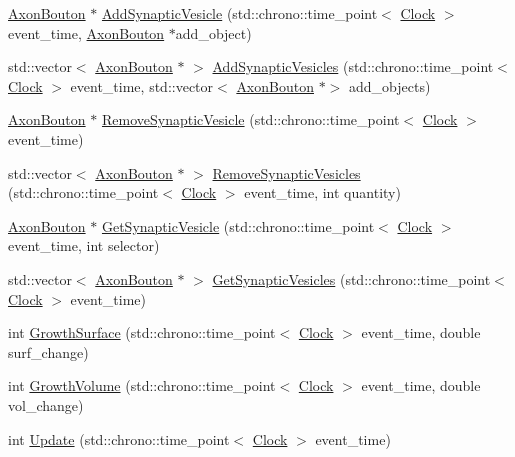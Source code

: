 \begin{DoxyCompactItemize}
\item 
\mbox{\hyperlink{class_axon_bouton}{Axon\+Bouton}} $\ast$ \mbox{\hyperlink{class_axon_bouton_a3009e5d49c699afa7f633b026b37ed77}{Add\+Synaptic\+Vesicle}} (std\+::chrono\+::time\+\_\+point$<$ \mbox{\hyperlink{universe_8h_a0ef8d951d1ca5ab3cfaf7ab4c7a6fd80}{Clock}} $>$ event\+\_\+time, \mbox{\hyperlink{class_axon_bouton}{Axon\+Bouton}} $\ast$add\+\_\+object)
\item 
std\+::vector$<$ \mbox{\hyperlink{class_axon_bouton}{Axon\+Bouton}} $\ast$ $>$ \mbox{\hyperlink{class_axon_bouton_a0e264da88f6ca5d77aa42f415cb4f3aa}{Add\+Synaptic\+Vesicles}} (std\+::chrono\+::time\+\_\+point$<$ \mbox{\hyperlink{universe_8h_a0ef8d951d1ca5ab3cfaf7ab4c7a6fd80}{Clock}} $>$ event\+\_\+time, std\+::vector$<$ \mbox{\hyperlink{class_axon_bouton}{Axon\+Bouton}} $\ast$$>$ add\+\_\+objects)
\item 
\mbox{\hyperlink{class_axon_bouton}{Axon\+Bouton}} $\ast$ \mbox{\hyperlink{class_axon_bouton_a1f0b13fa7ec408c9e0cfb22cea9bbe8c}{Remove\+Synaptic\+Vesicle}} (std\+::chrono\+::time\+\_\+point$<$ \mbox{\hyperlink{universe_8h_a0ef8d951d1ca5ab3cfaf7ab4c7a6fd80}{Clock}} $>$ event\+\_\+time)
\item 
std\+::vector$<$ \mbox{\hyperlink{class_axon_bouton}{Axon\+Bouton}} $\ast$ $>$ \mbox{\hyperlink{class_axon_bouton_ae4119170ef72beaed3c8a0eb1d80ef14}{Remove\+Synaptic\+Vesicles}} (std\+::chrono\+::time\+\_\+point$<$ \mbox{\hyperlink{universe_8h_a0ef8d951d1ca5ab3cfaf7ab4c7a6fd80}{Clock}} $>$ event\+\_\+time, int quantity)
\item 
\mbox{\hyperlink{class_axon_bouton}{Axon\+Bouton}} $\ast$ \mbox{\hyperlink{class_axon_bouton_a847ab3d3d214ddc85bdfd463c6d95d54}{Get\+Synaptic\+Vesicle}} (std\+::chrono\+::time\+\_\+point$<$ \mbox{\hyperlink{universe_8h_a0ef8d951d1ca5ab3cfaf7ab4c7a6fd80}{Clock}} $>$ event\+\_\+time, int selector)
\item 
std\+::vector$<$ \mbox{\hyperlink{class_axon_bouton}{Axon\+Bouton}} $\ast$ $>$ \mbox{\hyperlink{class_axon_bouton_af9a35ff7a6c32ac291021cccb3d40c9b}{Get\+Synaptic\+Vesicles}} (std\+::chrono\+::time\+\_\+point$<$ \mbox{\hyperlink{universe_8h_a0ef8d951d1ca5ab3cfaf7ab4c7a6fd80}{Clock}} $>$ event\+\_\+time)
\item 
int \mbox{\hyperlink{class_axon_bouton_a95fc006b2436e2c7784af2cc0bc9522e}{Growth\+Surface}} (std\+::chrono\+::time\+\_\+point$<$ \mbox{\hyperlink{universe_8h_a0ef8d951d1ca5ab3cfaf7ab4c7a6fd80}{Clock}} $>$ event\+\_\+time, double surf\+\_\+change)
\item 
int \mbox{\hyperlink{class_axon_bouton_a10ac4446e777376a3944c87b2bcf26b5}{Growth\+Volume}} (std\+::chrono\+::time\+\_\+point$<$ \mbox{\hyperlink{universe_8h_a0ef8d951d1ca5ab3cfaf7ab4c7a6fd80}{Clock}} $>$ event\+\_\+time, double vol\+\_\+change)
\item 
int \mbox{\hyperlink{class_axon_bouton_a26f89bac681b8f0894fe1ae249733917}{Update}} (std\+::chrono\+::time\+\_\+point$<$ \mbox{\hyperlink{universe_8h_a0ef8d951d1ca5ab3cfaf7ab4c7a6fd80}{Clock}} $>$ event\+\_\+time)
\end{DoxyCompactItemize}
